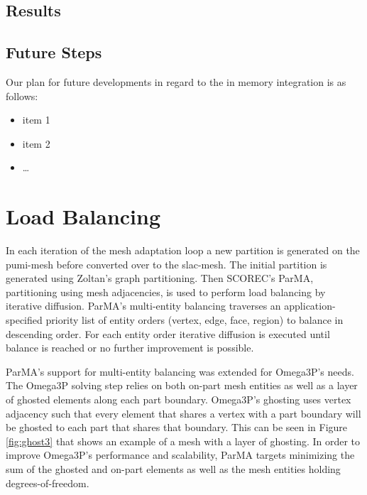 \documentclass[review,12pt]{elsarticle_summary_report}
\begin{document}
\subsection{\label{in_memory_results} Results}

\subsection{\label{in_memory_future} Future Steps}
Our plan for future developments in regard to the in memory integration is as follows:

\begin{itemize}
  \item item 1
  \item item 2
  \item \dots
\end{itemize}


\section{\label{load_balance}Load Balancing}
In each iteration of the mesh adaptation loop a new partition is generated on the
pumi-mesh before converted over to the slac-mesh. The initial partition is generated
using Zoltan's graph partitioning. Then SCOREC's ParMA, partitioning using mesh adjacencies,
is used to perform load balancing by iterative diffusion. ParMA's multi-entity balancing
traverses an application-specified priority list of entity orders (vertex, edge, face,
region) to balance in descending order.
For each entity order iterative diffusion is executed until balance is reached
or no further improvement is possible.

ParMA's support for multi-entity balancing was extended for Omega3P's needs.
The Omega3P solving step relies on both on-part mesh entities as well as a layer
of ghosted elements along each part boundary.
Omega3P's ghosting uses vertex adjacency such that every element that shares a
vertex with a part boundary will be ghosted to each part that shares that
boundary.
This can be seen in Figure \ref{fig:ghost3} that shows an example of a mesh with
a layer of ghosting.
In order to improve Omega3P's performance and scalability, ParMA targets
minimizing the sum of the ghosted and on-part elements as well as the mesh
entities holding degrees-of-freedom.
\end{document}
